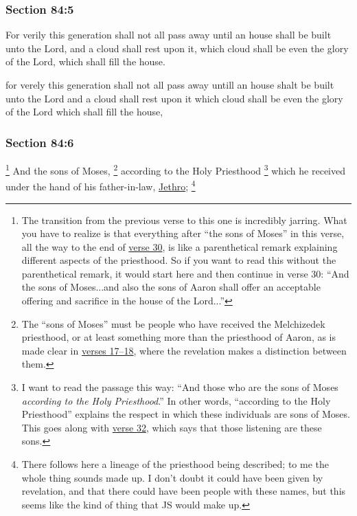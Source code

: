 	\subsubsection{Section 84:5} %
		\label{DC84-5}

		For verily this generation shall not all pass away until an house shall be built unto the Lord, and a cloud shall rest upon it, which cloud shall be even the glory of the Lord, which shall fill the house.

		\begin{framed}
		\scriptsize
			\begin{compactdesc}
				\item[JSP] for verely this generation shall not all pass away untill an house shalt be built unto the Lord and a cloud shall rest upon it which cloud shall be even the glory of the Lord which shall fill the house,
			\end{compactdesc}
		\end{framed}

	\subsubsection{Section 84:6} %
		\label{DC84-6}

		\footnote{%
			The transition from the previous verse to this one is incredibly jarring. What you have to realize is that everything after ``the sons of Moses'' in this verse, all the way to the end of \hyperref[DC84-30]{verse 30}, is like a parenthetical remark explaining different aspects of the priesthood. So if you want to read this without the parenthetical remark, it would start here and then continue in verse 30: ``And the sons of Moses...and also the sons of Aaron shall offer an acceptable offering and sacrifice in the house of the Lord...''
			}%
		And the sons of Moses,%
			\footnote{%
				The ``sons of Moses'' must be people who have received the Melchizedek priesthood, or at least something more than the priesthood of Aaron, as is made clear in \hyperref[DC84-17]{verses 17--18}, where the revelation makes a distinction between them.
				}
		according to the Holy Priesthood%
			\footnote{%
				I want to read the passage this way: ``And those who are the sons of Moses \textit{according to the Holy Priesthood}.'' In other words, ``according to the Holy Priesthood'' explains the respect in which these individuals are sons of Moses. This goes along with \hyperref[DC84-32]{verse 32}, which says that those listening are these sons.	
				}
		which he received under the hand of his father-in-law, \hyperref[JETHRO]{Jethro};%
			\footnote{%
				There follows here a lineage of the priesthood being described; to me the whole thing sounds made up. I don't doubt it could have been given by revelation, and that there could have been people with these names, but this seems like the kind of thing that JS would make up.
				}

